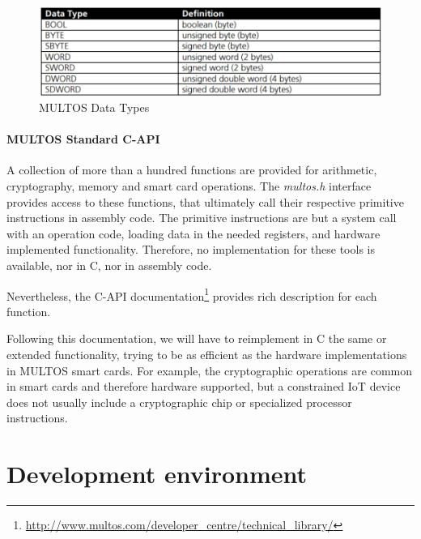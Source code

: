 \begin{figure}[bth]
	\begin{center}
		\includegraphics[width=\linewidth]{gfx/multosDataTypes}
	\end{center}
	\caption{MULTOS Data Types}
	\label{fig:multosDataTypes}
\end{figure}


\paragraph{MULTOS Standard C-API}

A collection of more than a hundred functions are provided for arithmetic, cryptography, memory and smart card operations. The \textit{multos.h} interface provides access to these functions, that ultimately call their respective primitive instructions in assembly code. The primitive instructions are but a system call with an operation code, loading data in the needed registers, and hardware implemented functionality. Therefore,  no implementation for these tools is available, nor in C, nor in assembly code.

Nevertheless, the C-API documentation\footnote{\url{http://www.multos.com/developer_centre/technical_library/}} provides rich description for each function.

Following this documentation, we will have to reimplement in C the same or extended functionality, trying to be as efficient as the hardware implementations in MULTOS smart cards. For example, the cryptographic operations are common in smart cards and therefore hardware supported, but a constrained IoT device does not usually include a cryptographic chip or specialized processor instructions.



\hfil

\section{Development environment}


